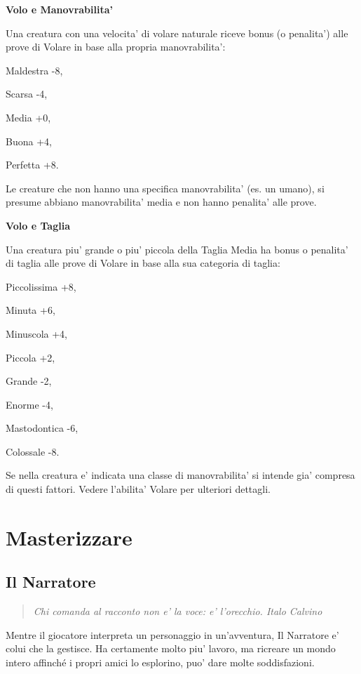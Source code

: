 \documentclass[a4paper,11pt,twoside,openany]{book}
\begin{document}
{		\textbf{Volo e Manovrabilita'}
		
		Una creatura con una velocita' di volare naturale riceve bonus (o penalita') alle prove di Volare in base alla propria manovrabilita':
		
		Maldestra -8,
		
		Scarsa -4,
		
		Media +0,
		
		Buona +4,
		
		Perfetta +8.
		
		Le creature che non hanno una specifica manovrabilita' (es. un umano), si presume abbiano manovrabilita' media e non hanno penalita' alle
		prove.
		
		\textbf{Volo e Taglia}
		
		Una creatura piu' grande o piu' piccola della Taglia Media ha bonus o penalita' di taglia alle prove di Volare in base alla sua categoria di taglia:
		
		Piccolissima +8,
		
		Minuta +6,
		
		Minuscola +4,
		
		Piccola +2,
		
		Grande -2,
		
		Enorme -4,
		
		Mastodontica -6,
		
		Colossale -8.
		
		Se nella creatura e' indicata una classe di manovrabilita' si intende gia' compresa di questi fattori. Vedere l'abilita' Volare per ulteriori dettagli.
		
		\pagebreak
		
		\section{Masterizzare}
		
		\label{masterizzare}
		
		
		\subsection{Il Narratore}
		
		\begin{quote}\textit{
				{Chi comanda al racconto non e' la voce: e' l'orecchio. Italo Calvino}
		}\end{quote}
		
		
		\label{il-narratore}
		
		Mentre il giocatore interpreta un personaggio in un'avventura, Il Narratore e' colui che la gestisce. Ha certamente molto piu' lavoro, ma ricreare un mondo intero affinché i propri amici lo esplorino, puo' dare molte soddisfazioni.
		
}
\end{document}
